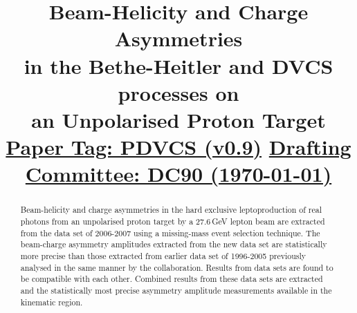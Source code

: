 \documentclass{elsart}
\begin{document}
 \begin{frontmatter}

\title{
	Beam-Helicity and Charge Asymmetries \\
        in the Bethe-Heitler and DVCS processes on \\
        an Unpolarised Proton Target
  	\underline{Paper Tag: PDVCS (v0.9)}
        \underline{Drafting Committee: DC90 (\today)}
}


\begin{abstract}
Beam-helicity and charge asymmetries in the hard exclusive leptoproduction of
real photons from an unpolarised proton target by a 27.6\,GeV lepton beam 
are extracted from the  data set of 2006-2007 using a
missing-mass event selection technique. The beam-charge asymmetry amplitudes extracted from the new data set are statistically more precise than those extracted from  earlier data set of 1996-2005 previously analysed in the same manner by the collaboration. Results from  data sets are found to be compatible with each other. Combined results from these data sets are extracted and  the statistically most precise asymmetry amplitude measurements available in the  kinematic region.
\end{abstract}

\end{frontmatter}
% 
\setvruler[15pt][1][1][3][1][30pt][30pt][-42pt]








\end{document}
